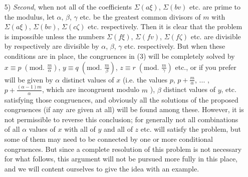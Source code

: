 \documentclass{book}
\theoremstyle{plain}
\theoremstyle{remark}
\newtheorem*{example}{Example}
\begin{document}
\begin{itemize}
\textit{First}, when all of the congruences have coefficients $\Sigma(a\xi)$, $\Sigma(bv)$ etc. which are prime to the modulus $m$, they can be solved according to the rules given before, and the complete solution of the problem will be given by congruences of the form $x \equiv p \; (\textrm{mod. }m)$, $y \equiv q \; (\textrm{mod. } m)$ etc. 

\begin{example} If the following congruences are proposed,
\[ x+ 3y + z \equiv 1\;, \;\; 4x + y + 5z \equiv 7\;,\;\; 2x+2y+z \equiv 3 \;(\textrm{mod. } 8) \]
then one finds $\xi=9$, $\xi'=1$, $\xi''=-14$, from which one derives $-15 x \equiv -26$, and therefore $x \equiv 6 \;(\textrm{mod. }8)$; in the same way it is found that $15y \equiv-4$, $15z \equiv 1$, and hence $y \equiv 4$, $z \equiv 7 \;(\textrm{mod. }8)$. \end{example}

\item[5)] \textit{Second}, when not all of the coefficients $\Sigma(a\xi)$, $\Sigma(bv)$ etc. are prime to the modulus, let $\alpha$, $\beta$, $\gamma$ etc. be the greatest common divisors of $m$ with $\Sigma(a\xi)$, $\Sigma(bv)$, $\Sigma(c\zeta)$ etc. respectively.  Then it is clear that the problem is impossible unless the numbers $\Sigma(f\xi)$, $\Sigma(fv)$, $\Sigma(f\zeta)$ etc. are divisible by respectively are divisible by $\alpha$, $\beta$, $\gamma$ etc. respectively.  But when these conditions are in place, the congruences  in (3) will be completely solved by $x \equiv p\;(\textrm{mod. }\frac{m}{\alpha})$, $y \equiv q\;(\textrm{mod. }\frac{m}{\beta})$, $z \equiv r\;(\textrm{mod. }\frac{m}{\gamma})$ etc., or if you prefer will be given by $\alpha$ distinct values of $x$ (i.e. the values $p$, $p+\frac{m}{\alpha}$, ... , $p+ \frac{(\alpha-1)m}{\alpha}$, which are incongruent modulo $m$ ), $\beta$ distinct values of $y$, etc.  satisfying those congruences, and obviously all the solutions of the proposed congruences (if any are given at all) will be found among these.   However, it is not permissible to reverse this conclusion; for generally not all combinations of all $\alpha$ values of $x$ with all of $y$ and all of $z$ etc. will satisfy the problem, but some of them may need to be connected by one or more conditional congruences.  But since a complete resolution of this problem is not necessary for what follows, this argument will not be pursued more fully in this place, and we will content ourselves to give the idea with an example.


\end{itemize}
\end{document}
